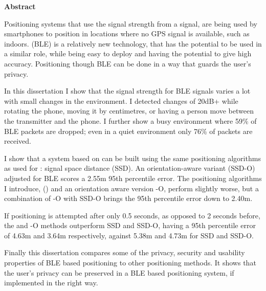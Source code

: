 \newpage
{\Huge \bf Abstract}
\vspace{24pt} 

Positioning systems that use the signal strength from a \wifi signal, are being used by smartphones to position in locations where no GPS signal is available, such as indoors.
\BLE (BLE) is a relatively new technology, that has the potential to be used in a similar role, while being easy to deploy and having the potential to give high accuracy.
Positioning though BLE can be done in a way that guards the user's privacy.

In this dissertation I show that the signal strength for BLE signals varies a lot with small changes in the environment.
I detected changes of 20dB+ while rotating the phone, moving it by centimetres, or having a person move between the transmitter and the phone.
I further show a busy environment where 59\% of BLE packets are dropped; even in a quiet environment only 76\% of packets are received.

I show that a \ptfp system based on \BLE can be built using the same positioning algorithms as used for \wifi: signal space distance (SSD).
An orientation-aware variant (SSD-O) adjusted for BLE scores a 2.55m 95th percentile error. 
The positioning algorithms I introduce,  (\aBRP) and an orientation aware version \aBRP-O, perform slightly worse, but a combination of \aBRP-O with SSD-O brings the 95th percentile error down to 2.40m.

If positioning is attempted after only 0.5 seconds, as opposed to 2 seconds before, the \aBRP and \aBRP-O methods outperform SSD and SSD-O, having a 95th percentile error of 4.63m and 3.64m respectively, against 5.38m and 4.73m for SSD and SSD-O.

Finally this dissertation compares some of the privacy, security and usability properties of BLE based positioning to other positioning methods.
It shows that the user's privacy can be preserved in a BLE based positioning system, if implemented in the right way.

\newpage
\vspace*{\fill}
